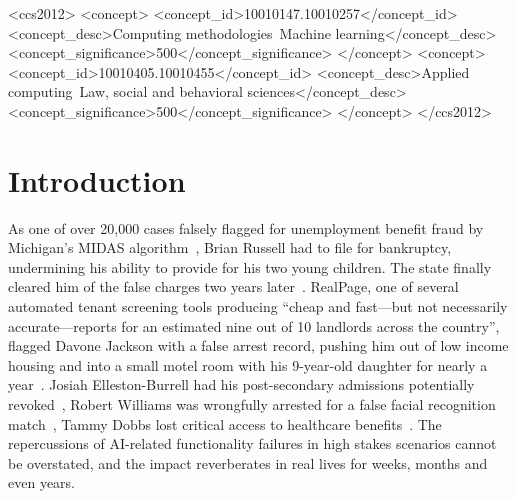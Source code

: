 \documentclass[acmconf,manuscript,screen,natbib=true]{acmart}
\begin{document}
\begin{CCSXML}
<ccs2012>
<concept>
<concept_id>10010147.10010257</concept_id>
<concept_desc>Computing methodologies~Machine learning</concept_desc>
<concept_significance>500</concept_significance>
</concept>
<concept>
<concept_id>10010405.10010455</concept_id>
<concept_desc>Applied computing~Law, social and behavioral sciences</concept_desc>
<concept_significance>500</concept_significance>
</concept>
</ccs2012>
\end{CCSXML}


\keywords{}


\maketitle

\section{Introduction}



As one of over 20,000 cases falsely flagged for unemployment benefit fraud by Michigan’s MIDAS algorithm~\cite{charette2018michigan}, Brian Russell had to file for bankruptcy, undermining his ability to provide for his two young children. The state finally cleared him of the false charges two years later~\cite{bankrupt_MIDAS}. RealPage, one of several automated tenant screening tools producing “cheap and fast—but not necessarily accurate—reports for an estimated nine out of 10 landlords across the country”, flagged Davone Jackson with a false arrest record, pushing him out of low income housing and into a small motel room with his 9-year-old daughter for nearly a year~\cite{kirchner2020automated,kirchner2020access}. Josiah Elleston-Burrell had his post-secondary admissions potentially revoked~\cite{alevels,kippin2021covid}, Robert Williams was wrongfully arrested for a false facial recognition match~\cite{hill2020wrongfully}, Tammy Dobbs lost critical access to healthcare benefits~\cite{lecher2018happens}. The repercussions of AI-related functionality failures in high stakes scenarios cannot be overstated, and the impact reverberates in real lives for weeks, months and even years. %
\end{document}
